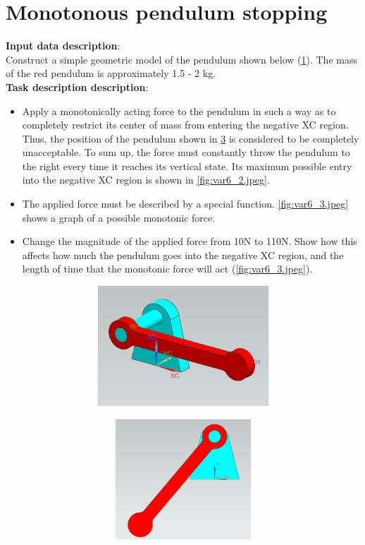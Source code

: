 \documentclass[12pt]{article}
\newcommand\ttask[3] 
 {
	\section*{#1}
	\textbf{Input data description}: \\ #2 \  \\
	\textbf{Task description description}: #3
	\newpage
 }
\begin{document}
\ttask{Monotonous pendulum stopping}{
	Construct a simple geometric model of the pendulum shown below (\cref{fig:var6_0.jpeg}). The mass of the red pendulum is approximately 1.5 - 2 kg.
}{
	\begin{itemize}
		\item Apply a monotonically acting force to the pendulum in such a way as to completely restrict its center of mass from entering the negative XC region. Thus, the position of the pendulum shown in \cref{fig:var6_1.jpeg} is considered to be completely unacceptable. To sum up, the force must constantly throw the pendulum to the right every time it reaches its vertical state. Its maximum possible entry into the negative XC region is shown in \cref{fig:var6_2.jpeg}.
		\item The applied force must be described by a special function. \cref{fig:var6_3.jpeg} shows a graph of a possible monotonic force. 
		\item Change the magnitude of the applied force from 10N to 110N. Show how this affects how much the pendulum goes into the negative XC region, and the length of time that the monotonic force will act (\cref{fig:var6_3.jpeg}).
	\end{itemize}
	\begin{figure}[H]
		\begin{subfigure}{0.49\textwidth}
			\centering\includegraphics[height=4.5cm,width=1\textwidth,keepaspectratio]{var6_0.jpeg}
			\caption{}
			\label{fig:var6_0.jpeg}
		\end{subfigure}
		\begin{subfigure}{0.49\textwidth}
			\centering\includegraphics[height=4.5cm,width=1\textwidth,keepaspectratio]{var6_1.jpeg}
			\caption{}
			\label{fig:var6_1.jpeg}
		\end{subfigure}


\end{figure}}
\end{document}

